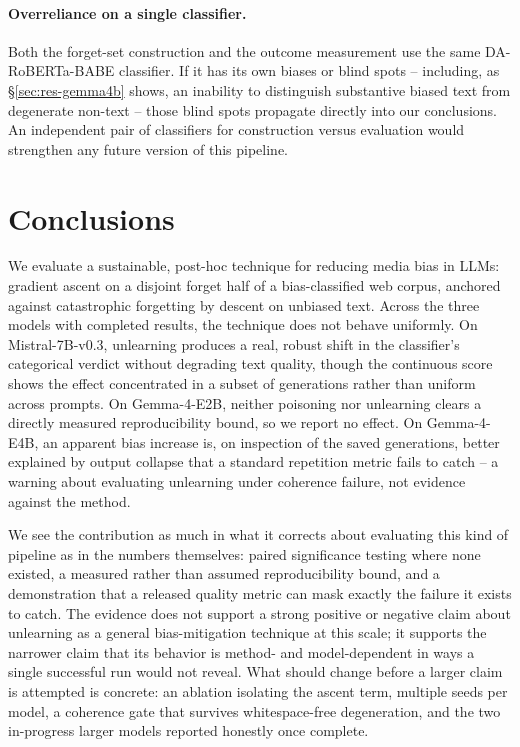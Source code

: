 \documentclass[runningheads]{llncs}
\begin{document}
\paragraph{Overreliance on a single classifier.} Both the forget-set construction and the outcome measurement use the same DA-RoBERTa-BABE classifier. If it has its own biases or blind spots -- including, as \S\ref{sec:res-gemma4b} shows, an inability to distinguish substantive biased text from degenerate non-text -- those blind spots propagate directly into our conclusions. An independent pair of classifiers for construction versus evaluation would strengthen any future version of this pipeline.

\section{Conclusions}
We evaluate a sustainable, post-hoc technique for reducing media bias in LLMs: gradient ascent on a disjoint forget half of a bias-classified web corpus, anchored against catastrophic forgetting by descent on unbiased text. Across the three models with completed results, the technique does not behave uniformly. On Mistral-7B-v0.3, unlearning produces a real, robust shift in the classifier's categorical verdict without degrading text quality, though the continuous score shows the effect concentrated in a subset of generations rather than uniform across prompts. On Gemma-4-E2B, neither poisoning nor unlearning clears a directly measured reproducibility bound, so we report no effect. On Gemma-4-E4B, an apparent bias increase is, on inspection of the saved generations, better explained by output collapse that a standard repetition metric fails to catch -- a warning about evaluating unlearning under coherence failure, not evidence against the method.

We see the contribution as much in what it corrects about evaluating this kind of pipeline as in the numbers themselves: paired significance testing where none existed, a measured rather than assumed reproducibility bound, and a demonstration that a released quality metric can mask exactly the failure it exists to catch. The evidence does not support a strong positive or negative claim about unlearning as a general bias-mitigation technique at this scale; it supports the narrower claim that its behavior is method- and model-dependent in ways a single successful run would not reveal. What should change before a larger claim is attempted is concrete: an ablation isolating the ascent term, multiple seeds per model, a coherence gate that survives whitespace-free degeneration, and the two in-progress larger models reported honestly once complete.



\end{document}
